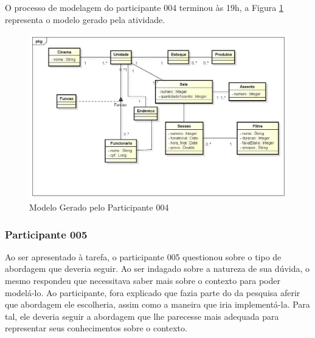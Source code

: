O processo de modelagem do participante 004 terminou às 19h, a Figura \ref{fig:Modelo_000_wagner} representa o modelo gerado pela atividade.

\begin{figure}[!ht]
    \centering
    \includegraphics[width=\textwidth, height=\textwidth]{imagens/Modelo_000_Wagner.jpg}
    \caption{Modelo Gerado pelo Participante 004}
    \label{fig:Modelo_000_wagner}
\end{figure}

\subsubsection{\hspace*{3pt} Participante 005}
\label{sec:participante_005}

Ao ser apresentado à tarefa, o participante 005 questionou sobre o tipo de abordagem que deveria seguir. Ao ser indagado sobre a natureza de sua dúvida, o mesmo respondeu que necessitava saber mais sobre o contexto para poder modelá-lo. Ao participante, fora explicado que fazia parte do da pesquisa aferir que abordagem ele escolheria, assim como a maneira que iria implementá-la. Para tal, ele deveria seguir a abordagem que lhe parecesse mais adequada para representar seus conhecimentos sobre o contexto. 

